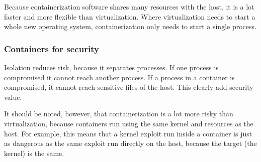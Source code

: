 Because containerization software shares many resources with the host, it is a lot faster and more flexible than virtualization. Where virtualization needs to start a whole new operating system, containerization only needs to start a single process.

\subsubsection{Containers for security}

Isolation reduces risk, because it separates processes. If one process is compromised it cannot reach another process. If a process in a container is compromised, it cannot reach sensitive files of the host. This clearly add security value.

\hfill

It should be noted, however, that containerization is a lot more risky than virtualization, because containers run using the same kernel and resources as the host. For example, this means that a kernel exploit run inside a container is just as dangerous as the same exploit run directly on the host, because the target (the kernel) is the same.
